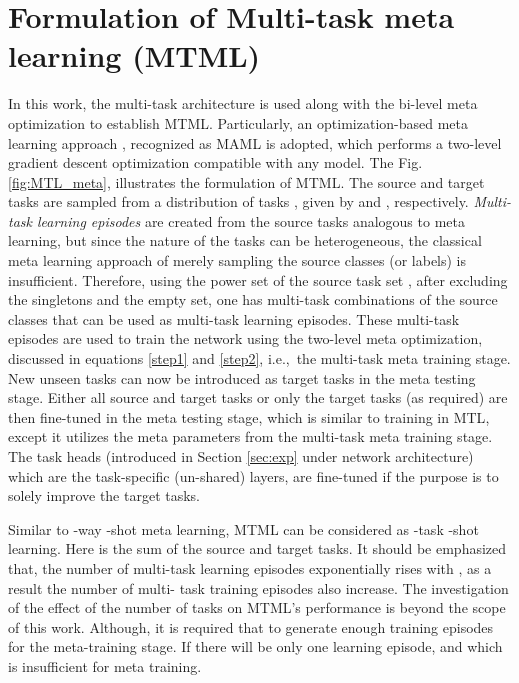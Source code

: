\documentclass[conference]{IEEEtran}
\newcommand*{\ie}		{i.e.,\ }
\begin{document}
\section{Formulation of Multi-task meta learning (\ac{MTML})}
In this work, the multi-task architecture is used along with the bi-level meta optimization to establish \ac{MTML}. 
Particularly, an optimization-based meta learning approach \cite{huisman2021survey}, recognized as \ac{MAML} \cite{pmlr-v70-finn17a} is adopted, which performs a two-level gradient descent optimization compatible with any model. 
The Fig. \ref{fig:MTL_meta}, illustrates the formulation of \ac{MTML}. 
The source and target tasks are sampled from a distribution of tasks , given by  and , respectively. 
\textit{Multi-task learning episodes} are created from the source tasks analogous to meta learning, but since the nature of the tasks can be heterogeneous, the classical meta learning approach of merely sampling the source classes (or labels) is insufficient. 
Therefore, using the power set of the source task set , after excluding the singletons and the empty set, one has  multi-task combinations of the source classes that can be used as multi-task learning episodes.
These multi-task episodes are used to train the network using the two-level meta optimization, discussed in equations \eqref{step1} and \eqref{step2}, \ie the multi-task meta training stage.
New unseen tasks can now be introduced as target tasks in the meta testing stage.
Either all source and target tasks or only the target tasks (as required) are then fine-tuned in the meta testing stage, which is similar to training in \ac{MTL}, except it utilizes the meta parameters from the  multi-task meta training stage.
The task heads (introduced in Section \ref{sec:exp} under network architecture) which are the task-specific (un-shared) layers, are fine-tuned if the purpose is to solely improve the target tasks.

Similar to -way -shot meta learning, \ac{MTML} can be considered as -task -shot learning. 
Here  is the sum of the source and target tasks.
It should be emphasized that, the number of multi-task learning episodes exponentially rises with , as a result the number of multi- task training episodes also increase.
The investigation of the effect of the number of tasks on MTML's performance is beyond the scope of this work.
Although, it is required that  to generate enough training episodes for the meta-training stage.
If  there will be only one learning episode, and which is insufficient for meta training.
\end{document}
